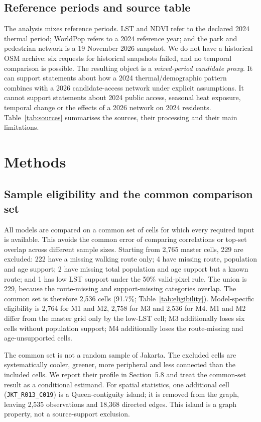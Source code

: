 \documentclass[times,twoside]{_Templates/MultiTargetManuscript}
\begin{document}
\subsection{Reference periods and source table}

The analysis mixes reference periods. LST and NDVI refer to the declared 2024
thermal period; WorldPop refers to a 2024 reference year; and the park and
pedestrian network is a 19 November 2026 snapshot. We do not have a historical
OSM archive: six requests for historical snapshots failed, and no temporal
comparison is possible. The resulting object is a \emph{mixed-period candidate
proxy}. It can support statements about how a 2024 thermal/demographic pattern
combines with a 2026 candidate-access network under explicit assumptions. It
cannot support statements about 2024 public access, seasonal heat exposure,
temporal change or the effects of a 2026 network on 2024 residents.
Table~\ref{tab:sources} summarises the sources, their processing and their main
limitations.



\section{Methods}

\subsection{Sample eligibility and the common comparison set}

All models are compared on a common set of cells for which every required input
is available. This avoids the common error of comparing correlations or top-set
overlap across different sample sizes. Starting from 2,765 master cells, 229 are
excluded: 222 have a missing walking route only; 4 have missing route,
population and age support; 2 have missing total population and age support but a
known route; and 1 has low LST support under the 50\% valid-pixel rule. The
union is 229, because the route-missing and support-missing categories overlap.
The common set is therefore 2,536 cells (91.7\%; Table~\ref{tab:eligibility}).
Model-specific eligibility is 2,764 for M1 and M2, 2,758 for M3 and 2,536 for M4. M1 and M2 differ from the
master grid only by the low-LST cell; M3 additionally loses six cells without
population support; M4 additionally loses the route-missing and age-unsupported
cells.

The common set is not a random sample of Jakarta. The excluded cells are
systematically cooler, greener, more peripheral and less connected than the
included cells. We report their profile in Section~5.8 and treat the common-set
result as a conditional estimand. For spatial statistics, one additional cell
(\texttt{JKT\_R013\_C019}) is a Queen-contiguity island; it is removed from the
graph, leaving 2,535 observations and 18,368 directed edges. This island is a
graph property, not a source-support exclusion.
\end{document}
